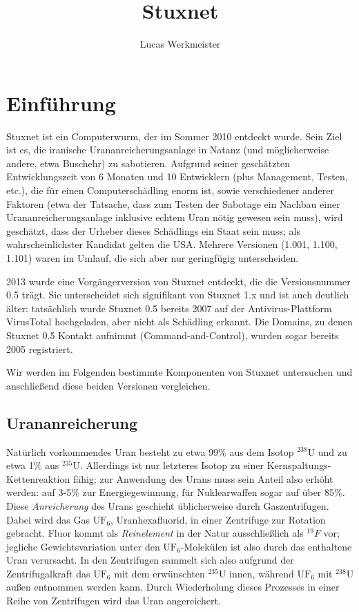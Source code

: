 \documentclass[a4paper]{article}
\title{Stuxnet}
\author{Lucas Werkmeister}
\begin{document}
\maketitle


\section{Einführung}

Stuxnet ist ein Computerwurm, der im Sommer 2010 entdeckt wurde.
Sein Ziel ist es, die iranische Urananreicherungsanlage in Natanz (und möglicherweise andere, etwa Buschehr) zu sabotieren.
Aufgrund seiner geschätzten Entwicklungszeit von 6 Monaten und 10 Entwicklern (plus Management, Testen, etc.),
die für einen Computerschädling enorm ist, sowie verschiedener anderer Faktoren
(etwa der Tatsache, dass zum Testen der Sabotage ein Nachbau einer Urananreicherungsanlage inklusive echtem Uran nötig gewesen sein muss),
wird geschätzt, dass der Urheber dieses Schädlings ein Staat sein muss;
als wahrscheinlichster Kandidat gelten die USA.
Mehrere Versionen (1.001, 1.100, 1.101) waren im Umlauf, die sich aber nur geringfügig unterscheiden.

2013 wurde eine Vorgängerversion von Stuxnet entdeckt, die die Versionsnummer 0.5 trägt.
Sie unterscheidet sich signifikant von Stuxnet 1.x und ist auch deutlich älter:
tatsächlich wurde Stuxnet 0.5 bereits 2007 auf der Antivirus-Plattform VirusTotal hochgeladen, aber nicht als Schädling erkannt.
Die Domains, zu denen Stuxnet 0.5 Kontakt aufnimmt (Command-and-Control), wurden sogar bereits 2005 registriert.

Wir werden im Folgenden bestimmte Komponenten von Stuxnet untersuchen und anschließend diese beiden Versionen vergleichen.

\subsection{Urananreicherung}

Natürlich vorkommendes Uran besteht zu etwa 99\% aus dem Isotop $^{238}\mathrm U$ und zu etwa 1\% aus $^{235}\mathrm U$.
Allerdings ist nur letzteres Isotop zu einer Kernspaltungs-Kettenreaktion fähig;
zur Anwendung des Urans muss sein Anteil also erhöht werden: auf 3-5\% zur Energiegewinnung, für Nuklearwaffen sogar auf über 85\%.
Diese \emph{Anreicherung} des Urans geschieht üblicherweise durch Gaszentrifugen.
Dabei wird das Gas $\mathrm{UF}_6$, Uranhexafluorid, in einer Zentrifuge zur Rotation gebracht.
Fluor kommt als \emph{Reinelement} in der Natur ausschließlich als $^{19}F$ vor;
jegliche Gewichtsvariation unter den $\mathrm{UF}_6$-Molekülen ist also durch das enthaltene Uran verursacht.
In den Zentrifugen sammelt sich also aufgrund der Zentrifugalkraft das $\mathrm{UF}_6$ mit dem erwünschten $^{235}\mathrm U$ innen,
während $\mathrm{UF}_6$ mit $^{238}\mathrm U$ außen entnommen werden kann.
Durch Wiederholung dieses Prozesses in einer Reihe von Zentrifugen wird das Uran angereichert.\cite{wiki:urananreicherung}
\end{document}
